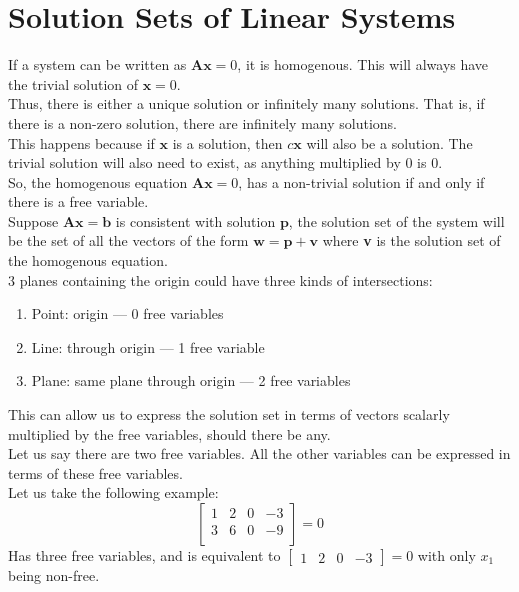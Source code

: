 \documentclass[nobib]{tufte-handout}
\begin{document}
\section{Solution Sets of Linear Systems}
If a system can be written as $\mathbf{Ax}=0$, it is homogenous. This will
always have the trivial solution of $\mathbf{x}=0$.\\ Thus, there is either a
unique solution or infinitely many solutions. That is, if there is a non-zero
solution, there are infinitely many solutions.\\ This happens because if
$\mathbf{x}$ is a solution, then $c\mathbf{x}$ will also be a solution. The
trivial solution will also need to exist, as anything multiplied by 0 is 0.\\
\quad So, the homogenous equation $\mathbf{Ax}=0$, has a non-trivial solution
if and only if there is a free variable.\\ \quad Suppose $\mathbf{Ax=b}$ is
consistent with solution $\mathbf{p}$, the solution set of the system will be
the set of all the vectors of the form $\mathbf{w=p+v}$ where \textbf{v} is the
solution set of the homogenous equation.\\ 3 planes containing the origin could
have three kinds of intersections:
\begin{enumerate}
    \item Point: origin --- 0 free variables
    \item Line: through origin --- 1 free variable
    \item Plane: same plane through origin --- 2 free variables
\end{enumerate}
This can allow us to express the solution set in terms of vectors scalarly multiplied by the free variables, should there be any.\\
Let us say there are two free variables. All the other variables can be expressed in terms of these free variables.\\
Let us take the following example:
\begin{equation*}
    \begin{bmatrix}
        1 & 2 & 0 & -3 \\
        3 & 6 & 0 & -9 \\
    \end{bmatrix} = 0
\end{equation*}
Has three free variables, and is equivalent to $\begin{bmatrix}1 & 2 & 0 & -3\end{bmatrix} = 0$ with only $x_1$ being non-free.\\
\end{document}

